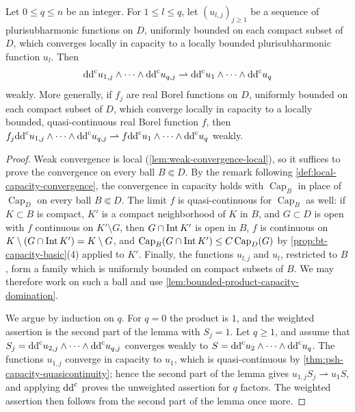 \begin{theorem}\label{thm:bt-capacity-continuity}
Let $0\le q\le n$ be an integer. For $1\le l\le q$, let $(u_{l,j})_{j\ge1}$ be a sequence of plurisubharmonic functions on $D$, uniformly bounded on each compact subset of $D$, which converges locally in capacity to a locally bounded plurisubharmonic function $u_l$. Then
\[
 \mathrm{dd}^{\mathrm{c}} u_{1,j}\wedge\cdots\wedge\mathrm{dd}^{\mathrm{c}} u_{q,j}
             \rightharpoonup\mathrm{dd}^{\mathrm{c}} u_1\wedge\cdots\wedge\mathrm{dd}^{\mathrm{c}} u_q
\]
weakly. More generally, if $f_j$ are real Borel functions on $D$, uniformly bounded on each compact subset of $D$, which converge locally in capacity to a locally bounded, quasi-continuous real Borel function $f$, then $f_j\mathrm{dd}^{\mathrm{c}} u_{1,j}\wedge\cdots\wedge\mathrm{dd}^{\mathrm{c}} u_{q,j}\rightharpoonup f\mathrm{dd}^{\mathrm{c}} u_1\wedge\cdots\wedge\mathrm{dd}^{\mathrm{c}} u_q$ weakly.
\end{theorem}
\begin{proof}
Weak convergence is local (\cref{lem:weak-convergence-local}), so it suffices to prove the convergence on every ball $B\Subset D$. By the remark following \cref{def:local-capacity-convergence}, the convergence in capacity holds with $\operatorname{Cap}_B$ in place of $\operatorname{Cap}_D$ on every ball $B\Subset D$. The limit $f$ is quasi-continuous for $\operatorname{Cap}_B$ as well: if $K\subset B$ is compact, $K'$ is a compact neighborhood of $K$ in $B$, and $G\subset D$ is open with $f$ continuous on $K'\setminus G$, then $G\cap\operatorname{Int} K'$ is open in $B$, $f$ is continuous on $K\setminus(G\cap\operatorname{Int} K')=K\setminus G$, and $\operatorname{Cap}_B(G\cap\operatorname{Int} K')\le C\operatorname{Cap}_D(G)$ by \cref{prop:bt-capacity-basic}(4) applied to $K'$. Finally, the functions $u_{l,j}$ and $u_l$, restricted to $B$, form a family which is uniformly bounded on compact subsets of $B$. We may therefore work on such a ball and use \cref{lem:bounded-product-capacity-domination}.

We argue by induction on $q$. For $q=0$ the product is $1$, and the weighted assertion is the second part of the lemma with $S_j=1$. Let $q\ge1$, and assume that $S_j=\mathrm{dd}^{\mathrm{c}} u_{2,j}\wedge\cdots\wedge\mathrm{dd}^{\mathrm{c}} u_{q,j}$ converges weakly to $S=\mathrm{dd}^{\mathrm{c}} u_2\wedge\cdots\wedge\mathrm{dd}^{\mathrm{c}} u_q$. The functions $u_{1,j}$ converge in capacity to $u_1$, which is quasi-continuous by \cref{thm:psh-capacity-quasicontinuity}; hence the second part of the lemma gives $u_{1,j}S_j\rightharpoonup u_1S$, and applying $\mathrm{dd}^{\mathrm{c}}$ proves the unweighted assertion for $q$ factors. The weighted assertion then follows from the second part of the lemma once more.
\end{proof}

